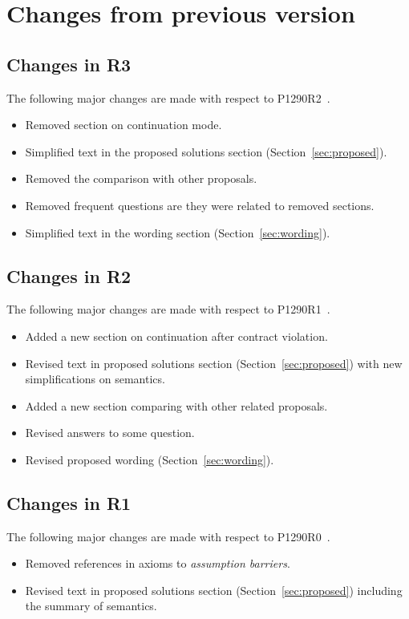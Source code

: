 \section{Changes from previous version}

\subsection{Changes in R3}

The following major changes are made with respect to P1290R2~\cite{p1290r2}.

\begin{itemize}

	\item Removed section on continuation mode.
	\item Simplified text in the proposed solutions section (Section~\ref{sec:proposed}).
	\item Removed the comparison with other proposals.
	\item Removed frequent questions are they were related to removed sections.
	\item Simplified text in the wording section (Section~\ref{sec:wording}).

\end{itemize}

\subsection{Changes in R2}

The following major changes are made with respect to P1290R1~\cite{p1290r1}.

\begin{itemize}
	\item Added a new section on continuation after contract violation.
	\item Revised text in proposed solutions section (Section~\ref{sec:proposed})
		with new simplifications on semantics.
	\item Added a new section comparing with other related proposals.
	\item Revised answers to some question.
	\item Revised proposed wording (Section~\ref{sec:wording}).
\end{itemize}

\subsection{Changes in R1}

The following major changes are made with respect to P1290R0~\cite{p1290r0}.

\begin{itemize}
  \item Removed references in axioms to \emph{assumption barriers}.
  \item Revised text in proposed solutions section (Section~\ref{sec:proposed})
	including the summary of semantics.
\end{itemize}
